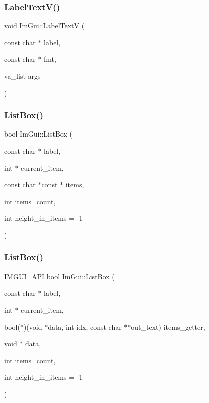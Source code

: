 \hypertarget{namespace_im_gui_a55e5a7edb676a8f5cd7f65443138a8a0}{}\label{namespace_im_gui_a55e5a7edb676a8f5cd7f65443138a8a0} 
\subsubsection{\texorpdfstring{Label\+Text\+V()}{LabelTextV()}}
{\footnotesize\ttfamily void Im\+Gui\+::\+Label\+TextV (\begin{DoxyParamCaption}\item[{const char $\ast$}]{label,  }\item[{const char $\ast$}]{fmt,  }\item[{va\+\_\+list}]{args }\end{DoxyParamCaption})}

\hypertarget{namespace_im_gui_a93d68a6602e155134405ce17085501e9}{}\label{namespace_im_gui_a93d68a6602e155134405ce17085501e9} 
\subsubsection{\texorpdfstring{List\+Box()}{ListBox()}\hspace{0.1cm}{\footnotesize\ttfamily [1/2]}}
{\footnotesize\ttfamily bool Im\+Gui\+::\+List\+Box (\begin{DoxyParamCaption}\item[{const char $\ast$}]{label,  }\item[{int $\ast$}]{current\+\_\+item,  }\item[{const char $\ast$const $\ast$}]{items,  }\item[{int}]{items\+\_\+count,  }\item[{int}]{height\+\_\+in\+\_\+items = {\ttfamily -\/1} }\end{DoxyParamCaption})}

\hypertarget{namespace_im_gui_ab5865b671bfa22738fac9ffd214470e2}{}\label{namespace_im_gui_ab5865b671bfa22738fac9ffd214470e2} 
\subsubsection{\texorpdfstring{List\+Box()}{ListBox()}\hspace{0.1cm}{\footnotesize\ttfamily [2/2]}}
{\footnotesize\ttfamily I\+M\+G\+U\+I\+\_\+\+A\+PI bool Im\+Gui\+::\+List\+Box (\begin{DoxyParamCaption}\item[{const char $\ast$}]{label,  }\item[{int $\ast$}]{current\+\_\+item,  }\item[{bool($\ast$)(void $\ast$data, int idx, const char $\ast$$\ast$out\+\_\+text)}]{items\+\_\+getter,  }\item[{void $\ast$}]{data,  }\item[{int}]{items\+\_\+count,  }\item[{int}]{height\+\_\+in\+\_\+items = {\ttfamily -\/1} }\end{DoxyParamCaption})}

